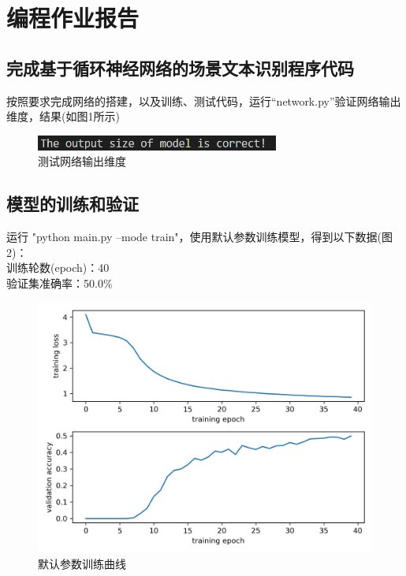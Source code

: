 \documentclass[a4paper]{article}
\begin{document}
\section{编程作业报告}
\subsection{完成基于循环神经网络的场景文本识别程序代码}
按照要求完成网络的搭建，以及训练、测试代码，运行“network.py”验证网络输出维度，结果(如图1所示)\\
\begin{figure}
    \centering
    \includegraphics[width=8cm]{Fig_1.png}
    \caption{测试网络输出维度}
\end{figure}

\subsection{模型的训练和验证}
运行 "python main.py --mode train"，使用默认参数训练模型，得到以下数据(图2)：\\
训练轮数(epoch)：40 \\
验证集准确率：50.0\% \\
\begin{figure}
    \centering
    \includegraphics[width=12cm]{Fig_2.jpg}
    \caption{默认参数训练曲线}
\end{figure}
\end{document}
